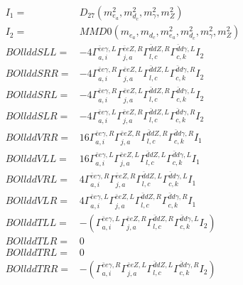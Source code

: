 \documentclass[A4,landscape]{article}
\begin{document}
\begin{align} 
I_1 = & D_{27}(m^2_{e_{{a}}}, m^2_{d_{{c}}}, m^2_{\gamma}, m^2_{Z}) \\ 
I_2 = & MMD0(m_{e_{{a}}}, m_{d_{{c}}}, m^2_{e_{{a}}}, m^2_{d_{{c}}}, m^2_{\gamma}, m^2_{Z}) \\ 
  BOllddSLL= & -4  \Gamma^{\bar{e}e \gamma ,L}_{a, i} \Gamma^{\bar{e}e Z ,R}_{j, a} \Gamma^{\bar{d}d Z ,R}_{l, c} \Gamma^{\bar{d}d \gamma ,L}_{c, k} I_2 \\ 
  BOllddSRR= & -4  \Gamma^{\bar{e}e \gamma ,R}_{a, i} \Gamma^{\bar{e}e Z ,L}_{j, a} \Gamma^{\bar{d}d Z ,L}_{l, c} \Gamma^{\bar{d}d \gamma ,R}_{c, k} I_2 \\ 
  BOllddSRL= & -4  \Gamma^{\bar{e}e \gamma ,R}_{a, i} \Gamma^{\bar{e}e Z ,L}_{j, a} \Gamma^{\bar{d}d Z ,R}_{l, c} \Gamma^{\bar{d}d \gamma ,L}_{c, k} I_2 \\ 
  BOllddSLR= & -4  \Gamma^{\bar{e}e \gamma ,L}_{a, i} \Gamma^{\bar{e}e Z ,R}_{j, a} \Gamma^{\bar{d}d Z ,L}_{l, c} \Gamma^{\bar{d}d \gamma ,R}_{c, k} I_2 \\ 
  BOllddVRR= & 16  \Gamma^{\bar{e}e \gamma ,R}_{a, i} \Gamma^{\bar{e}e Z ,R}_{j, a} \Gamma^{\bar{d}d Z ,R}_{l, c} \Gamma^{\bar{d}d \gamma ,R}_{c, k} I_1 \\ 
  BOllddVLL= & 16  \Gamma^{\bar{e}e \gamma ,L}_{a, i} \Gamma^{\bar{e}e Z ,L}_{j, a} \Gamma^{\bar{d}d Z ,L}_{l, c} \Gamma^{\bar{d}d \gamma ,L}_{c, k} I_1 \\ 
  BOllddVRL= & 4  \Gamma^{\bar{e}e \gamma ,R}_{a, i} \Gamma^{\bar{e}e Z ,R}_{j, a} \Gamma^{\bar{d}d Z ,L}_{l, c} \Gamma^{\bar{d}d \gamma ,L}_{c, k} I_1 \\ 
  BOllddVLR= & 4  \Gamma^{\bar{e}e \gamma ,L}_{a, i} \Gamma^{\bar{e}e Z ,L}_{j, a} \Gamma^{\bar{d}d Z ,R}_{l, c} \Gamma^{\bar{d}d \gamma ,R}_{c, k} I_1 \\ 
  BOllddTLL= & -( \Gamma^{\bar{e}e \gamma ,L}_{a, i} \Gamma^{\bar{e}e Z ,R}_{j, a} \Gamma^{\bar{d}d Z ,R}_{l, c} \Gamma^{\bar{d}d \gamma ,L}_{c, k} I_2) \\ 
  BOllddTLR= & 0 \\ 
  BOllddTRL= & 0 \\ 
  BOllddTRR= & -( \Gamma^{\bar{e}e \gamma ,R}_{a, i} \Gamma^{\bar{e}e Z ,L}_{j, a} \Gamma^{\bar{d}d Z ,L}_{l, c} \Gamma^{\bar{d}d \gamma ,R}_{c, k} I_2) \\ 
\end{align} 
\end{document}
